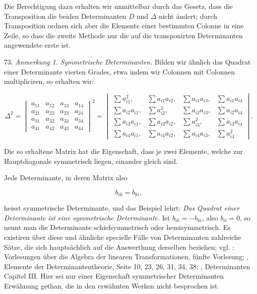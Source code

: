 \documentclass[11pt]{article}
\providecommand{\gesperrt}[1]{\textls[130]{#1}}
\providecommand{\weberpage}[1]{}
\begin{document}
Die Berechtigung dazu erhalten wir unmittelbar durch das Gesetz, dass die Transposition die beiden Determinanten $D$ und $\varDelta$ nicht ändert; durch Transposition ordnen sich aber die Elemente einer bestimmten Colonne in eine Zeile, so dass die zweite Methode nur die auf die transponirten Determinanten angewendete erste ist.

73. \textit{Anmerkung 1. Symmetrische Determinanten.} Bilden wir ähnlich das Quadrat einer Determinante vierten Grades, etwa indem wir Colonnen mit Colonnen multipliciren, so erhalten wir:

\[
\varDelta^2 =
\begin{vmatrix}
a_{11} & a_{12} & a_{13} & a_{14}\\
a_{21} & a_{22} & a_{23} & a_{24}\\
a_{31} & a_{32} & a_{33} & a_{34}\\
a_{41} & a_{42} & a_{43} & a_{44}
\end{vmatrix}^{2}
=
\begin{vmatrix}
\sum a_{i1}^{2}, & \sum a_{i1}a_{i2}, & \sum a_{i1}a_{i3}, & \sum a_{i1}a_{i4}\\
\sum a_{i2}a_{i1}, & \sum a_{i2}^{2}, & \sum a_{i2}a_{i3}, & \sum a_{i2}a_{i4}\\
\sum a_{i3}a_{i1}, & \sum a_{i3}a_{i2}, & \sum a_{i3}^{2}, & \sum a_{i3}a_{i4}\\
\sum a_{i4}a_{i1}, & \sum a_{i4}a_{i2}, & \sum a_{i4}a_{i3}, & \sum a_{i4}^{2}
\end{vmatrix}.
\]

Die so erhaltene Matrix hat die Eigenschaft, dass je zwei Elemente, welche zur Hauptdiagonale symmetrisch liegen, einander gleich sind.


\weberpage{78}

Jede Determinante, in deren Matrix also

\[
b_{ik} = b_{ki},
\]

heisst symmetrische Determinante, und das Beispiel lehrt: \glqq{}\textit{Das Quadrat einer Determinante ist eine symmetrische Determinante.}\grqq{} Ist $b_{ik} = -b_{ki}$, also $b_{ii}=0$, so nennt man die Determinante schiefsymmetrisch oder hemisymmetrisch. Es existiren über diese und ähnliche specielle Fälle von Determinanten zahlreiche Sätze, die sich hauptsächlich auf die Auswerthung derselben beziehen; vgl. \gesperrt{Salmon}: Vorlesungen über die Algebra der linearen Transformationen, fünfte Vorlesung; \gesperrt{Mansion}, Elemente der Determinantentheorie, Seite 10, 23, 26, 31, 34, 38; \gesperrt{Günther}, Determinanten Capitel III. Hier sei nur einer Eigenschaft symmetrischer Determinanten Erwähnung gethan, die in den erwähnten Werken nicht besprochen ist.
\end{document}
